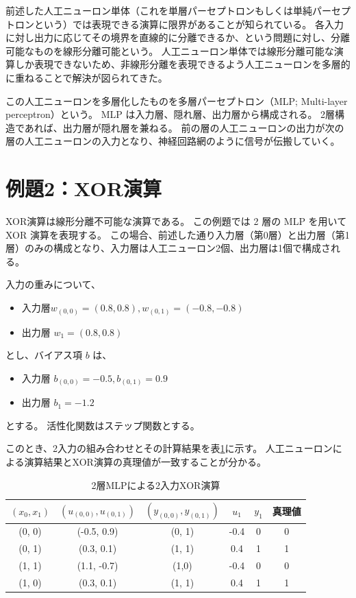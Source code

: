 前述した人工ニューロン単体（これを単層パーセプトロンもしくは単純パーセプトロンという）では表現できる演算に限界があることが知られている。
各入力に対し出力に応じてその境界を直線的に分離できるか、という問題に対し、分離可能なものを線形分離可能という。
人工ニューロン単体では線形分離可能な演算しか表現できないため、非線形分離を表現できるよう人工ニューロンを多層的に重ねることで解決が図られてきた。

この人工ニューロンを多層化したものを多層パーセプトロン（MLP; Multi-layer perceptron）という。
MLP は入力層、隠れ層、出力層から構成される。
2層構造であれば、出力層が隠れ層を兼ねる。
前の層の人工ニューロンの出力が次の層の人工ニューロンの入力となり、神経回路網のように信号が伝搬していく。

\section{例題2：XOR演算}

XOR演算は線形分離不可能な演算である。
この例題では 2 層の MLP を用いて XOR 演算を表現する。
この場合、前述した通り入力層（第0層）と出力層（第1層）のみの構成となり、入力層は人工ニューロン2個、出力層は1個で構成される。

入力の重みについて、
\begin{itemize}
    \item 入力層$w_{(0,0)} = (0.8, 0.8), w_{(0,1)} = (-0.8,-0.8)$
    \item 出力層 $w_1 = (0.8, 0.8)$
\end{itemize}

とし、バイアス項 $b$ は、
\begin{itemize}
    \item 入力層 $b_{(0,0)} = -0.5, b_{(0,1)} = 0.9$
    \item 出力層 $b_1 = -1.2$
\end{itemize}
とする。
活性化関数はステップ関数とする。

このとき、2入力の組み合わせとその計算結果を表\ref{tab:xor}に示す。
人工ニューロンによる演算結果とXOR演算の真理値が一致することが分かる。

\begin{table}[htb]
    \begin{center}
        \caption{2層MLPによる2入力XOR演算}
        \begin{tabular}{cccccc}
            \toprule
            $(x_0, x_1)$ & $(u_{(0,0)}, u_{(0,1)})$ & $(y_{(0,0)}, y_{(0,1)})$ & $u_1$ & $y_1$ & 真理値 \\
            \midrule
            (0, 0) & (-0.5, 0.9) & (0, 1) & -0.4 & 0 &0\\
            (0, 1) & (0.3, 0.1) & (1, 1) & 0.4 & 1 & 1 \\
            (1, 1) & (1.1, -0.7) & (1,0) & -0.4 & 0 & 0\\
            (1, 0) & (0.3, 0.1) & (1, 1) & 0.4 & 1 & 1\\ 
            \bottomrule            
        \end{tabular}
        \label{tab:xor}
    \end{center}
\end{table}

